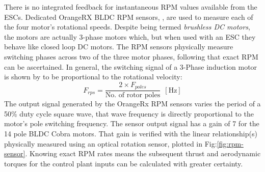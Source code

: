 \par
There is no integrated feedback for instantaneous RPM values available from the ESCs. Dedicated OrangeRX BLDC RPM sensors, \cite{orangerpm}, are used to measure each of the four motor's rotational speeds. Despite being termed \emph{brushless DC motors}, the motors are actually 3-phase motors which, but when used with an ESC they behave like closed loop DC motors. The RPM sensors physically measure switching phases across two of the three motor phases, following that exact RPM can be ascertained. In general, the switching signal of a 3-Phase induction motor is shown by \cite{vfd} to be proportional to the rotational velocity:
\begin{equation}
F_{rps}=\frac{2\times F_{poles}}{\text{No. of rotor poles}}~~[\text{Hz}]
\end{equation}
The output signal generated by the OrangeRx RPM sensors varies the period of a 50\% duty cycle square wave, that wave frequency is directly proportional to the motor's pole switching frequency. The sensor output signal has a gain of 7 for the 14 pole BLDC Cobra motors. That gain is verified with the linear relationship(s) physically measured using an optical rotation sensor, plotted in Fig:\ref{fig:rpm-sensor}. Knowing exact RPM rates means the subsequent thrust and aerodynamic torques for the control plant inputs can be calculated with greater certainty.
\par
